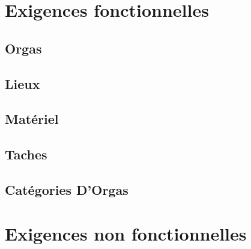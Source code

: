\section{Exigences fonctionnelles}
\subsection{Orgas}

\subsection{Lieux}
\subsection{Matériel}
\subsection{Taches}
\subsection{Catégories D'Orgas}


\section{Exigences non fonctionnelles}